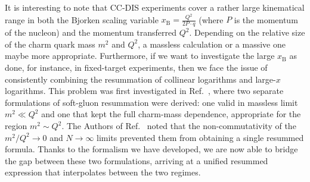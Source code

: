 \documentclass[letterpaper,11pt]{article}
\begin{document}
%
It is interesting to note that CC-DIS experiments cover a rather large kinematical range in both the Bjorken scaling variable $x_\text{B}= \frac{Q^2}{2 P\cdot q}$ (where $P$ is the momentum of the nucleon) and the momentum transferred $Q^2$. 
Depending on the relative size of the charm quark mass $m^2$ and $Q^2$, a massless calculation or a massive one maybe more appropriate. 
%
Furthermore, if we want to investigate the large $x_{\text{B}}$ as done, for instance, in fixed-target experiments, then we face the issue of consistently combining the resummation of collinear logarithms and large-$x$ logarithms.
%
This problem was first investigated in Ref.~\cite{Corcella:2003ib}, where two separate formulations of soft-gluon resummation were derived: one valid in massless limit $m^2 \ll Q^2$ and one that kept the full charm-mass dependence, appropriate for the region $m^2 \sim Q^2$. 
%
The Authors of Ref.~\cite{Corcella:2003ib} noted that the non-commutativity of the $m^2/Q^2 \to 0$ and $N \to \infty$ limits prevented them from obtaining a single resummed formula. 
%
%
Thanks to the formalism we have developed, we are now able to bridge the gap between these two formulations, arriving at a unified resummed expression that interpolates between the two regimes.
\end{document}
